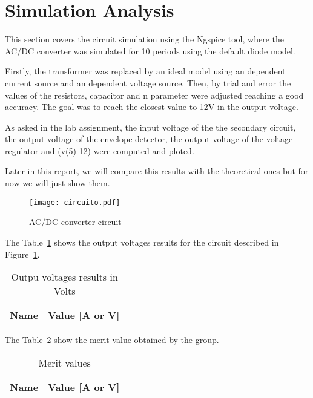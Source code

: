 \section{Simulation Analysis}

\label{sec:simulation}
\hspace{0,5cm} This section covers the circuit simulation using the Ngspice tool, where the AC/DC converter was simulated for 10 periods using the default diode model.
\par Firstly, the transformer was replaced by an ideal model using an dependent current source and an dependent voltage source. Then, by trial and error the values of the resistors, capacitor and n parameter were adjusted reaching a good accuracy. The goal was to reach the closest value to 12V in the output voltage.
\par As asked in the lab assignment, the input voltage of the the secondary circuit, the output voltage of the envelope detector, the output voltage of the voltage regulator and (v(5)-12) were computed and ploted.
\par Later in this report, we will compare this results with the theoretical ones but for now we will just show them.


\begin{figure}[!ht] \centering
\texttt{[image: circuito.pdf]}
\caption{AC/DC converter circuit} 
\label{fig:circuitoacdc}
\end{figure}

The Table~\ref{tab:op1} shows the output voltages results for the circuit described in Figure~\ref{fig:circuitoacdc}.

\begin{table}[!ht]
  \centering
  \begin{tabular}{|l|r|}
    \hline    
    {\bf Name} & {\bf Value [A or V]} \\ \hline
    
  \end{tabular}
  \caption{Outpu voltages results in Volts}
  \label{tab:op1}
\end{table}

The Table~\ref{tab:op2} show the merit value obtained by the group.
\begin{table}[!ht]
  \centering
  \begin{tabular}{|l|r|}
    \hline    
    {\bf Name} & {\bf Value [A or V]} \\ \hline
    
  \end{tabular}
  \caption{Merit values}
  \label{tab:op2}
\end{table}


